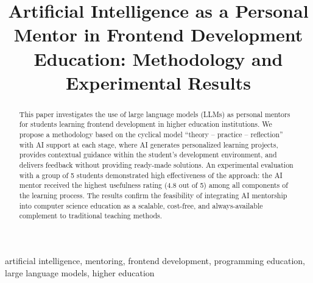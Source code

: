 \documentclass[conference,a4paper]{IEEEtran}
\begin{document}
\title{Artificial Intelligence as a Personal Mentor in Frontend Development Education: Methodology and Experimental Results}

\author{
\and
{}
}

\maketitle

\begin{abstract}
This paper investigates the use of large language models (LLMs) as personal mentors for students learning frontend development in higher education institutions. We propose a methodology based on the cyclical model ``theory -- practice -- reflection'' with AI support at each stage, where AI generates personalized learning projects, provides contextual guidance within the student's development environment, and delivers feedback without providing ready-made solutions. An experimental evaluation with a group of 5 students demonstrated high effectiveness of the approach: the AI mentor received the highest usefulness rating (4.8 out of 5) among all components of the learning process. The results confirm the feasibility of integrating AI mentorship into computer science education as a scalable, cost-free, and always-available complement to traditional teaching methods.
\end{abstract}

\begin{IEEEkeywords}
artificial intelligence, mentoring, frontend development, programming education, large language models, higher education
\end{IEEEkeywords}
\end{document}

